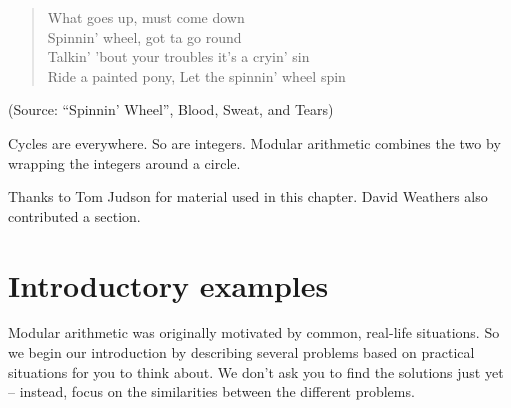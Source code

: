 
\begin{verse}
What goes up, must come down\\
Spinnin' wheel, got ta go round\\
Talkin' 'bout your troubles it's a cryin' sin\\
Ride a painted pony, Let the spinnin' wheel spin
\end{verse}
(Source:  ``Spinnin' Wheel'', Blood, Sweat, and Tears)
\bigskip

Cycles are everywhere. So are integers. Modular arithmetic combines the two by wrapping the integers around a circle.
\medskip

Thanks to Tom Judson for material used in this chapter.  David Weathers also contributed a section.

\section{Introductory examples\quad
{}}\label{sec:Mod.1}
Modular arithmetic was originally motivated by common, real-life situations. So we begin our introduction by describing several problems  based on practical situations for you to think about. We don't ask you to find the solutions just yet -- instead, focus on the similarities between the different problems. 

